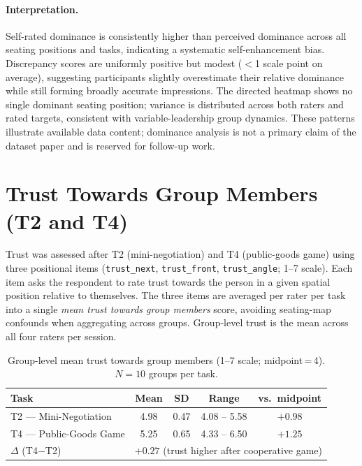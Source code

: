 \documentclass[11pt,a4paper]{article}
\begin{document}
\paragraph{Interpretation.}
Self-rated dominance is consistently higher than perceived dominance across
all seating positions and tasks, indicating a systematic self-enhancement bias.
Discrepancy scores are uniformly positive but modest ($<$1 scale point on
average), suggesting participants slightly overestimate their relative
dominance while still forming broadly accurate impressions.
The directed heatmap shows no single dominant seating position; variance is
distributed across both raters and rated targets, consistent with
variable-leadership group dynamics.
These patterns illustrate available data content; dominance analysis is not a
primary claim of the dataset paper and is reserved for follow-up work.

\section{Trust Towards Group Members (T2 and T4)}
\label{sec:trust}

Trust was assessed after T2 (mini-negotiation) and T4 (public-goods game)
using three positional items (\texttt{trust\_next}, \texttt{trust\_front},
\texttt{trust\_angle}; 1–7 scale).
Each item asks the respondent to rate trust towards the person in a given
spatial position relative to themselves.
The three items are averaged per rater per task into a single
\emph{mean trust towards group members} score, avoiding seating-map
confounds when aggregating across groups.
Group-level trust is the mean across all four raters per session.

\begin{table}[htb]
  \centering
  \caption{Group-level mean trust towards group members (1–7 scale;
    midpoint\,=\,4). $N=10$ groups per task.}
  \label{tab:trust}
  \small
  \begin{tabular}{lcccc}
    \toprule
    Task & Mean & SD & Range & vs.\ midpoint \\
    \midrule
    T2 — Mini-Negotiation   & 4.98 & 0.47 & 4.08 – 5.58 & $+0.98$ \\
    T4 — Public-Goods Game  & 5.25 & 0.65 & 4.33 – 6.50 & $+1.25$ \\
    $\Delta$ (T4$-$T2)      & \multicolumn{4}{l}{$+0.27$ (trust higher after cooperative game)} \\
    \bottomrule
  \end{tabular}
\end{table}
\end{document}
